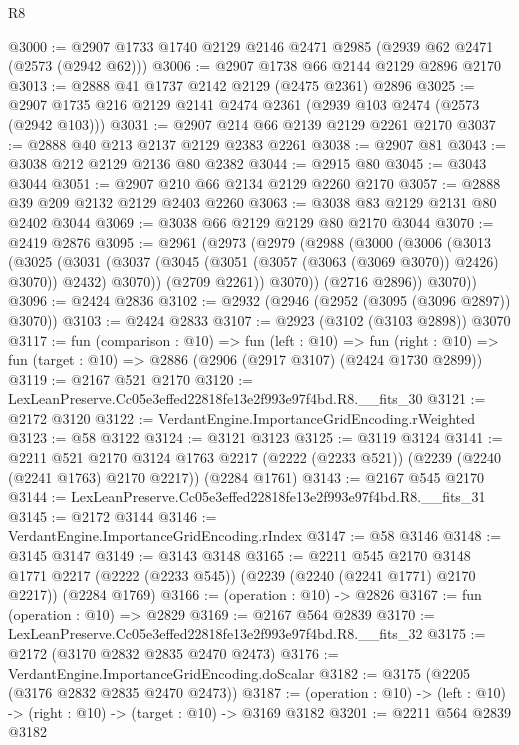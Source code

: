 \begin{lexlean}{R8}
\begin{coremodule}
@3000 := @2907 @1733 @1740 @2129 @2146 @2471 @2985 (@2939 @62 @2471 (@2573 (@2942 @62)))
@3006 := @2907 @1738 @66 @2144 @2129 @2896 @2170
@3013 := @2888 @41 @1737 @2142 @2129 (@2475 @2361) @2896
@3025 := @2907 @1735 @216 @2129 @2141 @2474 @2361 (@2939 @103 @2474 (@2573 (@2942 @103)))
@3031 := @2907 @214 @66 @2139 @2129 @2261 @2170
@3037 := @2888 @40 @213 @2137 @2129 @2383 @2261
@3038 := @2907 @81
@3043 := @3038 @212 @2129 @2136 @80 @2382
@3044 := @2915 @80
@3045 := @3043 @3044
@3051 := @2907 @210 @66 @2134 @2129 @2260 @2170
@3057 := @2888 @39 @209 @2132 @2129 @2403 @2260
@3063 := @3038 @83 @2129 @2131 @80 @2402 @3044
@3069 := @3038 @66 @2129 @2129 @80 @2170 @3044
@3070 := @2419 @2876
@3095 := @2961
    (@2973
      (@2979
        (@2988
          (@3000
            (@3006
              (@3013
                (@3025
                  (@3031
                    (@3037 (@3045 (@3051 (@3057 (@3063 (@3069 @3070)) @2426) @3070)) @2432)
                    @3070))
                (@2709 @2261))
              @3070))
          (@2716 @2896))
        @3070))
@3096 := @2424 @2836
@3102 := @2932 (@2946 (@2952 (@3095 (@3096 @2897)) @3070))
@3103 := @2424 @2833
@3107 := @2923 (@3102 (@3103 @2898)) @3070
@3117 := fun (comparison : @10) =>
  fun (left : @10) =>
  fun (right : @10) => fun (target : @10) => @2886 (@2906 (@2917 @3107) (@2424 @1730 @2899))
@3119 := @2167 @521 @2170
@3120 := LexLeanPreserve.Cc05e3effed22818fe13e2f993e97f4bd.R8.__fits_30
@3121 := @2172 @3120
@3122 := VerdantEngine.ImportanceGridEncoding.rWeighted
@3123 := @58 @3122
@3124 := @3121 @3123
@3125 := @3119 @3124
@3141 := @2211
    @521
    @2170
    @3124
    @1763
    @2217
    (@2222 (@2233 @521))
    (@2239 (@2240 (@2241 @1763) @2170 @2217))
    (@2284 @1761)
@3143 := @2167 @545 @2170
@3144 := LexLeanPreserve.Cc05e3effed22818fe13e2f993e97f4bd.R8.__fits_31
@3145 := @2172 @3144
@3146 := VerdantEngine.ImportanceGridEncoding.rIndex
@3147 := @58 @3146
@3148 := @3145 @3147
@3149 := @3143 @3148
@3165 := @2211
    @545
    @2170
    @3148
    @1771
    @2217
    (@2222 (@2233 @545))
    (@2239 (@2240 (@2241 @1771) @2170 @2217))
    (@2284 @1769)
@3166 := (operation : @10) -> @2826
@3167 := fun (operation : @10) => @2829
@3169 := @2167 @564 @2839
@3170 := LexLeanPreserve.Cc05e3effed22818fe13e2f993e97f4bd.R8.__fits_32
@3175 := @2172 (@3170 @2832 @2835 @2470 @2473)
@3176 := VerdantEngine.ImportanceGridEncoding.doScalar
@3182 := @3175 (@2205 (@3176 @2832 @2835 @2470 @2473))
@3187 := (operation : @10) -> (left : @10) -> (right : @10) -> (target : @10) -> @3169 @3182
@3201 := @2211
    @564
    @2839
    @3182

\end{coremodule}
\end{lexlean}
